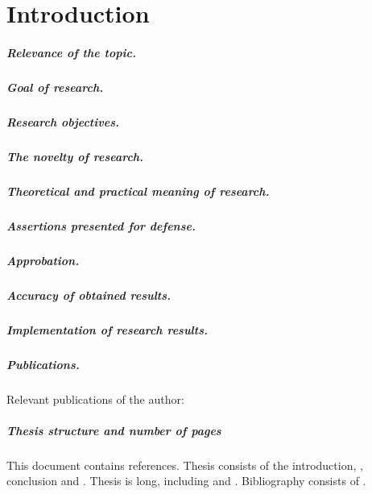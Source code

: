\chapter*{Introduction}                         %


\paragraph*{Relevance of the topic.}
\paragraph*{Goal of research.}
\paragraph*{Research objectives.}
\paragraph*{The novelty of research.}
\paragraph*{Theoretical and practical meaning of research.}
\paragraph*{Assertions presented for defense.}

\paragraph*{Approbation.}
\paragraph*{Accuracy of obtained results.}
\paragraph*{Implementation of research results.}
\paragraph*{Publications.}
Relevant publications of the author:
\printAllMyPapper

\paragraph*{Thesis structure and number of pages}
This document contains  references.
Thesis consists of the introduction,
,
conclusion and
.
Thesis is 
 long, including
 and
.
Bibliography consists of
.

